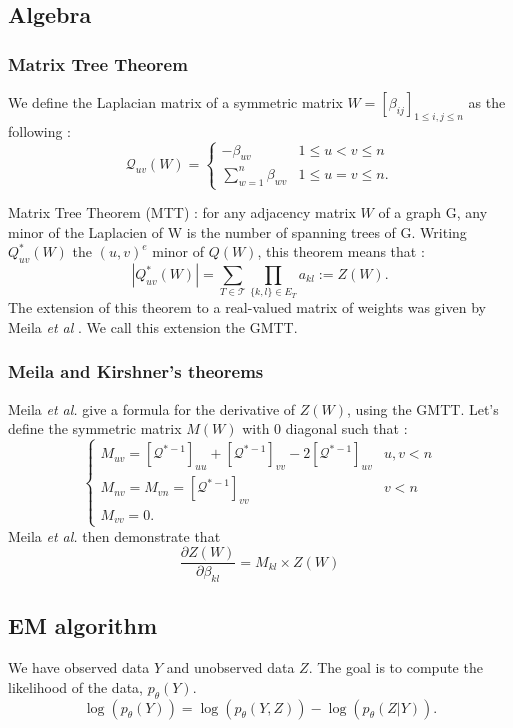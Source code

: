 \documentclass[a4paper,11pt]{article}
\begin{document}
  \subsection{Algebra}
    \subsubsection{Matrix Tree Theorem}
    We define the Laplacian matrix of a symmetric matrix $W=[\beta_{ij}]_{1\leq i,j\leq n}$ as the following :
 \[\mathcal{Q}_{uv}(W)=\begin{cases}
               -\beta_{uv} & 1\leq u<v \leq n\\
               \sum_{w=1}^n \beta_{wv} & 1\leq u=v \leq n.
            \end{cases}\]
    
    Matrix Tree Theorem (MTT) \cite{kirch}: for any adjacency matrix $W$ of a graph G, any minor of the Laplacien of W is the number 
    of spanning trees of G. Writing $Q^*_{uv}(W)$ the $(u,v)^e$ minor of $Q(W)$, this theorem means that :
    \[ |Q^*_{uv}(W)|=\sum_{T\in\mathcal{T}} \prod_{\{k,l\}\in E_T} a_{kl} := Z(W).\]
   The extension of this theorem to a real-valued matrix of weights was given by Meila \textit{et al} \cite{meila}.
 We call this extension the GMTT.
    \subsubsection{Meila and Kirshner's theorems}
    
     Meila \textit{et al.} give a formula for the derivative of $Z(W)$, using the GMTT. Let's define the symmetric matrix  $M(W)$ 
     with 0 diagonal such that :
 \[\begin{cases}
    M_{uv} = [\mathcal{Q}^{*-1}]_{uu} + [\mathcal{Q}^{*-1}]_{vv} -2[\mathcal{Q}^{*-1}]_{uv} & u,v < n\\
    M_{nv} =M_{vn} =[\mathcal{Q}^{*-1}]_{vv} & v<n\\
     M_{vv} =0.
   \end{cases}\]
Meila \textit{et al.} then demonstrate that 
\begin{equation}
\label{meila}
 \frac{\partial Z(W)}{\partial \beta_{kl}} = M_{kl} \times Z(W)
\end{equation}


  \subsection{EM algorithm}

We have observed data $Y$ and unobserved data $Z$. The goal is to compute the likelihood of the data, $p_\theta (Y)$.
\[ \log(p_\theta (Y)) = \log (p_\theta (Y,Z)) - \log(p_\theta (Z|Y)).\]
\end{document}
